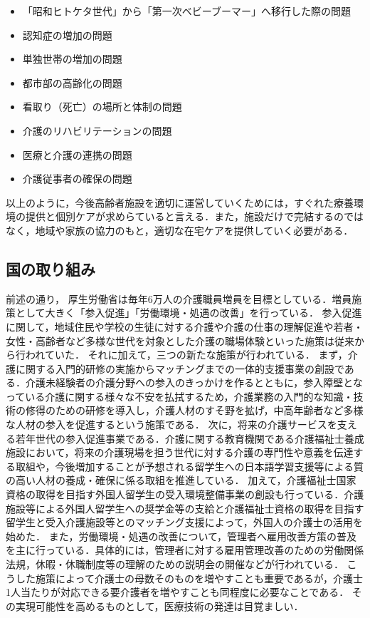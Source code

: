 \begin{itemize}
 \item 「昭和ヒトケタ世代」から「第一次ベビーブーマー」へ移行した際の問題
 \item 認知症の増加の問題
 \item 単独世帯の増加の問題
 \item 都市部の高齢化の問題
 \item 看取り（死亡）の場所と体制の問題
 \item 介護のリハビリテーションの問題
 \item 医療と介護の連携の問題
 \item 介護従事者の確保の問題
\end{itemize}

以上のように，今後高齢者施設を適切に運営していくためには，すぐれた療養環境の提供と個別ケアが求めらていると言える．また，施設だけで完結するのではなく，地域や家族の協力のもと，適切な在宅ケアを提供していく必要がある．

\subsection{国の取り組み}

前述の通り， 厚生労働省は毎年6万人の介護職員増員を目標としている．増員施策として大きく「参入促進」「労働環境・処遇の改善」を行っている．
参入促進に関して，地域住民や学校の生徒に対する介護や介護の仕事の理解促進や若者・女性・高齢者など多様な世代を対象とした介護の職場体験といった施策は従来から行われていた．
それに加えて，三つの新たな施策が行われている．
まず，介護に関する入門的研修の実施からマッチングまでの一体的支援事業の創設である．介護未経験者の介護分野への参入のきっかけを作るとともに，参入障壁となっている介護に関する様々な不安を払拭するため，介護業務の入門的な知識・技術の修得のための研修を導入し，介護人材のすそ野を拡げ，中高年齢者など多様な人材の参入を促進するという施策である．
次に，将来の介護サービスを支える若年世代の参入促進事業である．介護に関する教育機関である介護福祉士養成施設において，将来の介護現場を担う世代に対する介護の専門性や意義を伝達する取組や，今後増加することが予想される留学生への日本語学習支援等による質の高い人材の養成・確保に係る取組を推進している．
加えて，介護福祉士国家資格の取得を目指す外国人留学生の受入環境整備事業の創設も行っている．介護施設等による外国人留学生への奨学金等の支給と介護福祉士資格の取得を目指す留学生と受入介護施設等とのマッチング支援によって，外国人の介護士の活用を始めた．
また，労働環境・処遇の改善について，管理者へ雇用改善方策の普及を主に行っている．具体的には，管理者に対する雇用管理改善のための労働関係法規，休暇・休職制度等の理解のための説明会の開催などが行われている．
こうした施策によって介護士の母数そのものを増やすことも重要であるが，介護士1人当たりが対応できる要介護者を増やすことも同程度に必要なことである．
その実現可能性を高めるものとして，医療技術の発達は目覚ましい．

